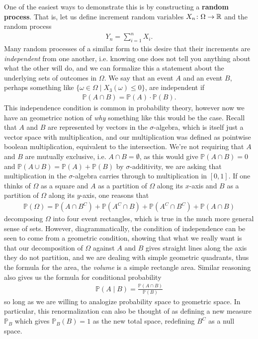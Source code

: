 \documentclass[11pt]{article}
\begin{document}
One of the easiest ways to demonstrate this is by constructing a \textbf{random process}. That is, let us define increment random variables $X_n \colon \Omega \to \mathbb{R}$ and the random process \begin{gather*}
Y_n = \sum_{i=1}^n X_i.
\end{gather*}
Many random processes of a similar form to this desire that their increments are \emph{independent} from one another, i.e. knowing one does not tell you anything about what the other will do, and we can formalize this a statement about the underlying sets of outcomes in $\Omega$. We say that an event $A$ and an event $B$, perhaps something like $\{\omega \in \Omega \mid X_3(\omega) \le 0 \}$, are independent if \begin{gather*}
\mathbb{P}(A \cap B) = \mathbb{P}(A) \cdot \mathbb{P}(B).
\end{gather*}
This independence condition is common in probability theory, however now we have an geometricc notion of \emph{why} something like this would be the case. Recall that $A$ and $B$ are represented by vectors in the $\sigma$-algebra, which is itself just a vector space with multiplication, and our multiplication was defined as pointwise boolean multiplication, equivalent to the intersection. We're not requiring that $A$ and $B$ are mutually exclusive, i.e. $A \cap B = \emptyset$, as this would give $\mathbb{P}(A \cap B) = 0$ and $\mathbb{P}(A \cup B) = \mathbb{P}(A) + \mathbb{P}(B)$ by $\sigma$-additivity, we are asking that multiplication in the $\sigma$-algebra carries through to multiplication in $[0,1]$. If one thinks of $\Omega$ as a square and $A$ as a partition of $\Omega$ along its $x$-axis and $B$ as a partition of $\Omega$ along its $y$-axis, one reasons that
\begin{gather*}
\mathbb{P}(\Omega) = \mathbb{P}(A \cap B^C) + \mathbb{P}(A^C \cap B) + \mathbb{P}(A^C \cap B^C) + \mathbb{P}(A \cap B)
\end{gather*}
decomposing $\Omega$ into four event rectangles, which is true in the much more general sense of sets. However, diagrammatically, the condition of independence can be seen to come from a geometric condition, showing that what we really want is that our decomposition of $\Omega$ against $A$ and $B$ gives straight lines along the axis they do not partition, and we are dealing with simple geometric quadrants, thus the formula for the area, the \emph{volume} is a simple rectangle area. Similar reasoning also gives us the formula for conditional probability \begin{gather*}
\mathbb{P}(A \mid B) = \frac{\mathbb{P}(A \cap B)}{\mathbb{P}(B)}
\end{gather*}
so long as we are willing to analogize probability space to geometric space. In particular, this renormalization can also be thought of as defining a new measure $\mathbb{P}_B$ which gives $\mathbb{P}_B(B) = 1$ as the new total space, redefining $B^C$ as a null space.
\end{document}
